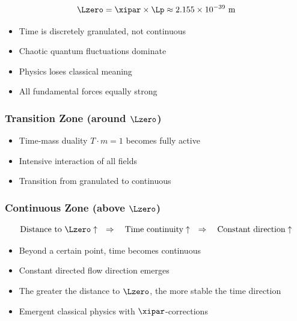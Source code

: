 	\begin{equation}
		\Lzero = \xipar \times \Lp \approx 2.155 \times 10^{-39} \text{ m}
	\end{equation}
	
	\begin{itemize}
		\item Time is discretely granulated, not continuous
		\item Chaotic quantum fluctuations dominate
		\item Physics loses classical meaning
		\item All fundamental forces equally strong
	\end{itemize}
	
	\subsubsection{Transition Zone (around $\Lzero$)}
	
	\begin{itemize}
		\item Time-mass duality $T \cdot m = 1$ becomes fully active
		\item Intensive interaction of all fields
		\item Transition from granulated to continuous
	\end{itemize}
	
	\subsubsection{Continuous Zone (above $\Lzero$)}
	
	\begin{tcolorbox}[colback=blue!5!white,colframe=blue!75!black,title=Central Insight]
		\begin{equation}
			\text{Distance to } \Lzero \uparrow \quad \Rightarrow \quad \text{Time continuity} \uparrow \quad \Rightarrow \quad \text{Constant direction} \uparrow
		\end{equation}
	\end{tcolorbox}
	
	\begin{itemize}
		\item Beyond a certain point, time becomes continuous
		\item Constant directed flow direction emerges
		\item The greater the distance to $\Lzero$, the more stable the time direction
		\item Emergent classical physics with $\xipar$-corrections
	\end{itemize}
	
